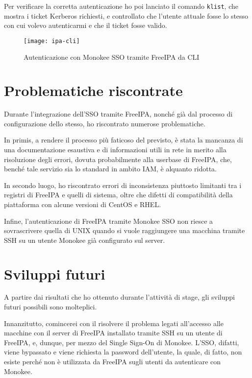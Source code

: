 Per verificare la corretta autenticazione ho poi lanciato il comando \texttt{klist}, che mostra i ticket Kerberos richiesti, e controllato che l'utente attuale fosse lo stesso con cui volevo autenticarmi e che il ticket fosse valido.  

\begin{figure}[!h] 
    \centering 
    \texttt{[image: ipa-cli]} 
    \caption{Autenticazione con Monokee SSO tramite FreeIPA da CLI}
    \label{fig:ipa-cli}
\end{figure}


\section{Problematiche riscontrate}

Durante l'integrazione dell'SSO tramite FreeIPA, nonché già dal processo di configurazione dello stesso, ho riscontrato numerose problematiche.

In primis, a rendere il processo più faticoso del previsto, è stata la mancanza di una  documentazione esaustiva e di informazioni utili in rete in merito alla risoluzione degli errori, dovuta probabilmente alla userbase di FreeIPA, che, benché tale servizio sia lo standard in ambito IAM, è alquanto ridotta.

In secondo luogo, ho riscontrato errori di inconsistenza piuttosto limitanti tra i registri di FreeIPA e quelli di sistema, oltre che difetti di compatibilità della piattaforma con alcune versioni di CentOS e RHEL.

Infine, l'autenticazione di FreeIPA tramite Monokee SSO non riesce a sovrascrivere quella di UNIX quando si vuole raggiungere una macchina tramite SSH su un utente Monokee già configurato sul server. 

\section{Sviluppi futuri}
A partire dai risultati che ho ottenuto durante l'attività di stage, gli sviluppi futuri possibili sono molteplici.

Innanzitutto, comincerei con il risolvere il problema legati all'accesso alle macchine con il server di FreeIPA installato tramite SSH su un utente di FreeIPA, e, dunque, per mezzo del Single Sign-On di Monokee. L'SSO, difatti, viene bypassato e viene richiesta la password dell'utente, la quale, di fatto, non esiste perché non è utilizzata da FreeIPA sugli utenti da autenticare con Monokee. 

